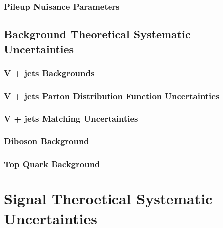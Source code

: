 \documentclass[10pt,twoside,cucitura,classica,english,openany]{toptesi}
\begin{document}


\subsubsection{Pileup Nuisance Parameters}
\label{sec:pile-nuis-param}



\subsection{Background Theoretical Systematic Uncertainties}
\label{sec:backgr-theor-syst}



\subsubsection{V + jets Backgrounds}
\label{sec:v-+-jets}



\subsubsection{V + jets Parton Distribution Function Uncertainties}
\label{sec:v-+-jets-pdf}



\subsubsection{V + jets Matching Uncertainties}
\label{sec:v-+-jets-matching}



\subsubsection{Diboson Background}
\label{sec:diboson-background}



\subsubsection{Top Quark Background}
\label{sec:top-quark-background}



\section{Signal Theroetical Systematic Uncertainties}
\label{sec:ther-syst-uncert}
\end{document}
